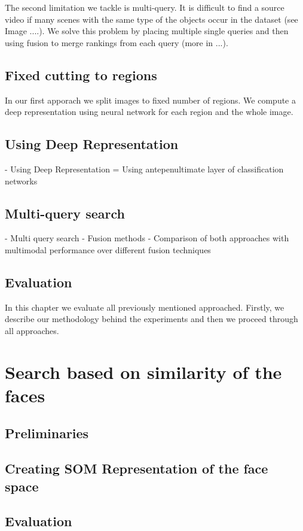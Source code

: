 The second limitation we tackle is multi-query. It is difficult to find a source video if many scenes with the same type of the objects occur in the dataset (see Image ....). We solve this problem by placing multiple single queries and then using fusion to merge rankings from each query (more in ...).
\section{Fixed cutting to regions}

In our first apporach we split images to fixed number of regions. We compute a deep representation using neural network for each region and the whole image. 
\section{ Using Deep Representation}
   - Using Deep Representation
      = Using antepenultimate layer of classification networks

\section{Multi-query search}
- Multi query search
  - Fusion methods
  - Comparison of both approaches with multimodal performance over different fusion techniques

\section{Evaluation}
In this chapter we evaluate all previously mentioned approached. Firstly, we describe our methodology behind the experiments and then we proceed through all approaches. 

\chapter{Search based on similarity of the faces}
\section{Preliminaries}
\section{Creating SOM Representation of the face space}
\section{Evaluation}

